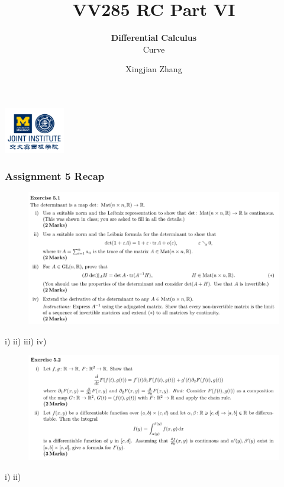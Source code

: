 \documentclass[12pt, t]{beamer}
\title{VV285 RC Part VI}
\subtitle{\textbf{Differential Calculus}\\\large Curve}
\institute[UM-SJTU JI]{Univerity of Michigan-Shanghai Jiao Tong University Joint Institute}
\author{Xingjian Zhang}
\begin{document}
\begin{frame}
    \titlepage
    \begin{center}
        \includegraphics[height=2cm]{logo2.png}
    \end{center}
\end{frame}

\begin{frame}[allowframebreaks]
    \frametitle{Assignment 5 Recap}
    \begin{figure}[H]
        \centering
        \includegraphics[width=\textwidth]{2020-06-24-23-32-09.png}
    \end{figure}

    \newpage
    i)
    \newpage
    ii)
    \newpage
    iii)
    \newpage
    iv)
    \newpage
    \begin{figure}[H]
        \centering
        \includegraphics[width=\textwidth]{2020-06-24-23-32-34.png}
    \end{figure}
    \newpage
    i)
    \newpage
    ii)

\end{frame}
\end{document}
